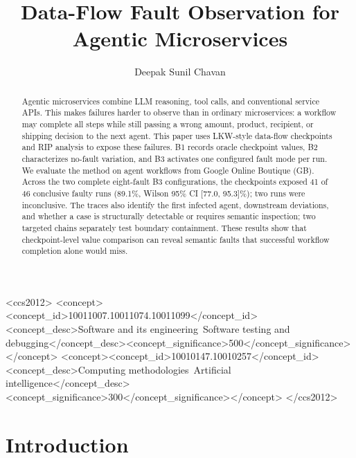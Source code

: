 \documentclass[sigconf,review,anonymous,balance=false]{acmart}
\title{Data-Flow Fault Observation for Agentic Microservices}
\author{Deepak Sunil Chavan}
\affiliation{%
  \institution{Concordia University}
  \department{Department of Electrical and Computer Engineering}
  \city{Montreal}
  \country{Canada}}
\begin{document}
\begin{abstract}
Agentic microservices combine LLM reasoning, tool calls, and conventional
service APIs. This makes failures harder to observe than in ordinary
microservices: a workflow may complete all steps while still passing a wrong
amount, product, recipient, or shipping decision to the next agent. This paper
uses LKW-style data-flow checkpoints and RIP analysis to expose these failures.
B1 records oracle checkpoint values, B2 characterizes no-fault variation, and
B3 activates one configured fault mode per run. We evaluate the method on agent
workflows from Google Online Boutique (GB). Across the two
complete eight-fault B3 configurations, the checkpoints exposed 41 of 46
conclusive faulty runs (89.1\%, Wilson 95\% CI [77.0, 95.3]\%); two runs were
inconclusive. The traces also identify the first infected agent, downstream
deviations, and whether a case is structurally detectable or requires semantic
inspection; two targeted chains separately test boundary containment. These
results show that checkpoint-level value comparison can
reveal semantic faults that successful workflow completion alone would miss.
\end{abstract}

\begin{CCSXML}
<ccs2012>
 <concept><concept_id>10011007.10011074.10011099</concept_id><concept_desc>Software and its engineering~Software testing and debugging</concept_desc><concept_significance>500</concept_significance></concept>
 <concept><concept_id>10010147.10010257</concept_id><concept_desc>Computing methodologies~Artificial intelligence</concept_desc><concept_significance>300</concept_significance></concept>
</ccs2012>
\end{CCSXML}


\maketitle

\section{Introduction}
\end{document}
